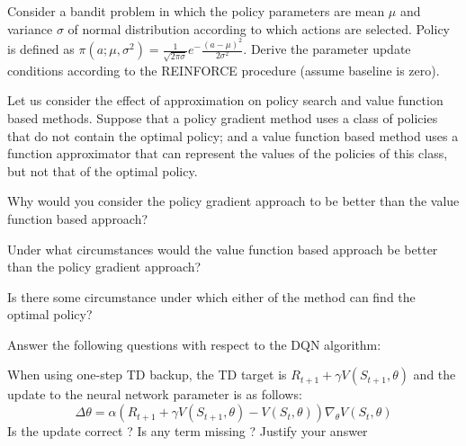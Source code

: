 \documentclass[solution,addpoints,12pt]{exam}
\begin{document}
\begin{questions}
\question[3]
Consider a bandit problem in which the policy parameters are mean $ \mu$ and variance $\sigma$ of normal distribution according to which actions are selected. Policy is defined as $ \pi(a;\mu,\sigma^2) = \frac{1}{\sqrt{2\pi\sigma}}e^-\frac{(a-\mu)^2}{2\sigma^2}$. Derive the parameter update conditions according to the REINFORCE procedure (assume baseline is zero).

\begin{solution}


\end{solution}
\question[6]
 Let us consider the effect of approximation on policy search and value function based methods. Suppose that a policy gradient method uses a class of policies that do not contain the optimal policy; and a value function based method uses a function approximator that can represent the values of the policies of this class, but not that of the optimal policy.
 \begin{enumerate}[label=(\alph*)]
     \question[2]  Why would you consider the policy gradient approach to be better than the value function based approach?
     \begin{solution}
     
     \end{solution}
     \question[2]  Under what circumstances would the value function based approach be better than the policy gradient approach?
     \begin{solution}
     
     \end{solution}
     \question[2]  Is there some circumstance under which either of the method can find the optimal policy?
     \begin{solution}
     
     \end{solution}
 
 \end{enumerate}
 

\question[4] Answer the following questions with respect to the DQN algorithm:
\begin{itemize}
    \question [2] When using one-step TD backup, the TD target is $R_{t+1}+\gamma V(S_{t+1},\theta)$ and the update to the neural network parameter is as follows:\\
    \begin{equation}
        \Delta \theta=\alpha(R_{t+1}+\gamma V(S_{t+1},\theta)-V(S_{t},\theta))\nabla_{\theta}V(S_{t},\theta)
    \end{equation}
    Is the update correct ? Is any term missing ? Justify your answer
    \begin{solution}
    

\end{solution}
\end{itemize}
\end{questions}
\end{document}
